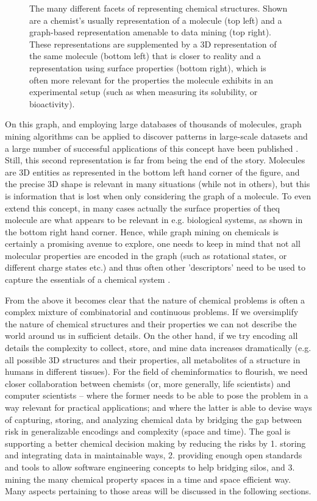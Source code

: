 \documentclass{sig-alternate}
\begin{document}
\begin{figure}
\centering
{}
\caption{The many different facets of representing chemical structures. Shown
are a chemist’s usually representation of a molecule (top left) and a
graph-based representation amenable to data mining (top right). These
representations are supplemented by a 3D representation of the same molecule
(bottom left) that is closer to reality and a representation using surface
properties (bottom right), which is often more relevant for the properties the
molecule exhibits in an experimental setup (such as when measuring its
solubility, or bioactivity).}
\end{figure}

On this graph, and employing large databases of thousands of molecules, graph
mining algorithms can be applied to discover patterns in large-scale datasets
and a large number of successful applications of this concept have been
published \cite{wegner2006,horst2009}. Still, this second representation is far
from being the end of the story. Molecules are 3D entities as represented in the
bottom left hand corner of the figure, and the precise 3D shape is relevant in
many situations (while not in others), but this is information that is lost when
only considering the graph of a molecule. To even extend this concept, in many
cases actually the surface properties of theq molecule are what appears to be
relevant in e.g. biological systems, as shown in the bottom right hand corner.
Hence, while graph mining on chemicals is certainly a promising avenue to
explore, one needs to keep in mind that not all molecular properties are encoded
in the graph (such as rotational states, or different charge states etc.) and
thus often other 'descriptors' need to be used to capture the essentials of a
chemical system \cite{bender2004}.

From the above it becomes clear that the nature of chemical problems is often a
complex mixture of combinatorial and continuous problems. If we oversimplify the
nature of chemical structures and their properties we can not describe the world
around us in sufficient details. On the other hand, if we try encoding all
details the complexity to collect, store, and mine data increases dramatically
(e.g. all possible 3D structures and their properties, all metabolites of a
structure in humans in different tissues). For the field of cheminformatics to
flourish, we need closer collaboration between chemists (or, more generally,
life scientists) and computer scientists – where the former needs to be able to
pose the problem in a way relevant for practical applications; and where the
latter is able to devise ways of capturing, storing, and analyzing chemical data
by bridging the gap between risk in generalizable encodings and complexity
(space and time). The goal is supporting a better chemical decision making by
reducing the risks by 1. storing and integrating data in maintainable ways, 2.
providing enough open standards and tools to allow software engineering concepts
to help bridging silos, and 3. mining the many chemical property spaces in a
time and space efficient way. Many aspects pertaining to those areas will be
discussed in the following sections.
\end{document}
